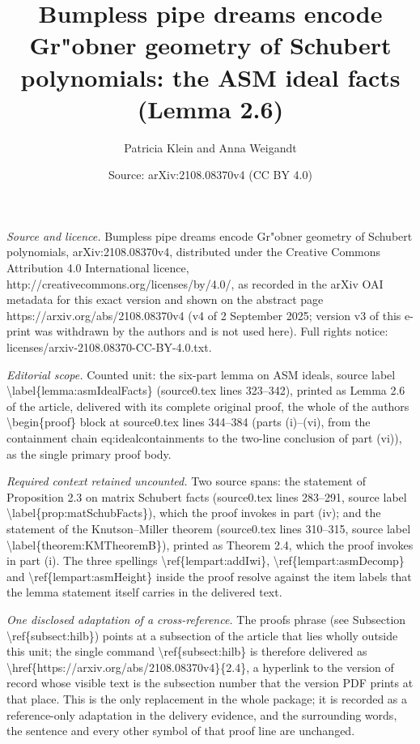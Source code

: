 \documentclass[10pt,a4paper]{amsart}
\title[Bumpless pipe dreams encode Gr"obner geometry of Schubert polynomials]{Bumpless pipe dreams encode Gr"obner geometry of Schubert polynomials: the ASM ideal facts (Lemma 2.6)}
\author{Patricia Klein and Anna Weigandt}
\date{Source: arXiv:2108.08370v4 (CC BY 4.0)}
\newtheorem{Main Conjecture}[theorem]{Main Conjecture}
\theoremstyle{remark}
\theoremstyle{plain}
\begin{document}
\maketitle
\noindent\emph{Source and licence.} Bumpless pipe dreams encode Gr"obner geometry of Schubert polynomials, arXiv:2108.08370v4, distributed under the Creative Commons Attribution 4.0 International licence, http://creativecommons.org/licenses/by/4.0/, as recorded in the arXiv OAI metadata for this exact version and shown on the abstract page https://arxiv.org/abs/2108.08370v4 (v4 of 2 September 2025; version v3 of this e-print was withdrawn by the authors and is not used here). Full rights notice: licenses/arxiv-2108.08370-CC-BY-4.0.txt.\par\smallskip
\noindent\textit{Editorial scope.} Counted unit: the six-part lemma on ASM ideals, source label \textbackslash{}label\{lemma:asmIdealFacts\} (source0.tex lines 323--342), printed as Lemma 2.6 of the article, delivered with its complete original proof, the whole of the authors\textquotesingle{} \textbackslash{}begin\{proof\} block at source0.tex lines 344--384 (parts (i)--(vi), from the containment chain eq:idealcontainments to the two-line conclusion of part (vi)), as the single primary proof body.\par
\noindent\textit{Required context retained uncounted.} Two source spans: the statement of Proposition 2.3 on matrix Schubert facts (source0.tex lines 283--291, source label \textbackslash{}label\{prop:matSchubFacts\}), which the proof invokes in part (iv); and the statement of the Knutson--Miller theorem (source0.tex lines 310--315, source label \textbackslash{}label\{theorem:KMTheoremB\}), printed as Theorem 2.4, which the proof invokes in part (i). The three spellings \textbackslash{}ref\{lempart:addIwi\}, \textbackslash{}ref\{lempart:asmDecomp\} and \textbackslash{}ref\{lempart:asmHeight\} inside the proof resolve against the item labels that the lemma statement itself carries in the delivered text.\par
\noindent\textit{One disclosed adaptation of a cross-reference.} The proof\textquotesingle s phrase (see Subsection \textbackslash{}ref\{subsect:hilb\}) points at a subsection of the article that lies wholly outside this unit; the single command \textbackslash{}ref\{subsect:hilb\} is therefore delivered as \textbackslash{}href\{https://arxiv.org/abs/2108.08370v4\}\{2.4\}, a hyperlink to the version of record whose visible text is the subsection number that the version PDF prints at that place. This is the only replacement in the whole package; it is recorded as a reference-only adaptation in the delivery evidence, and the surrounding words, the sentence and every other symbol of that proof line are unchanged.\par
\end{document}
